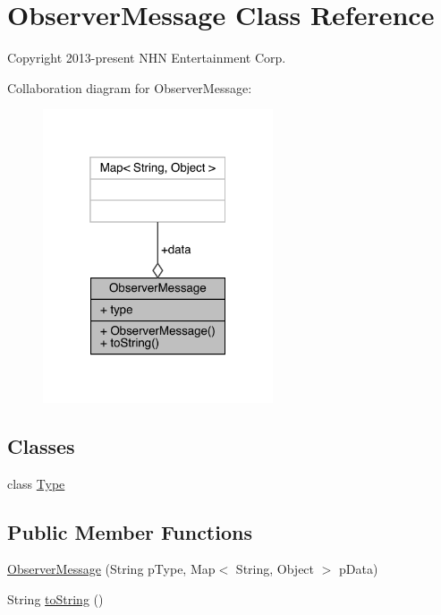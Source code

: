 \hypertarget{classcom_1_1toast_1_1android_1_1gamebase_1_1observer_1_1_observer_message}{}\section{Observer\+Message Class Reference}
\label{classcom_1_1toast_1_1android_1_1gamebase_1_1observer_1_1_observer_message}


Copyright 2013-\/present N\+HN Entertainment Corp.  




Collaboration diagram for Observer\+Message\+:\nopagebreak
\begin{figure}[H]
\begin{center}
\leavevmode
\includegraphics[width=193pt]{classcom_1_1toast_1_1android_1_1gamebase_1_1observer_1_1_observer_message__coll__graph}
\end{center}
\end{figure}
\subsection*{Classes}
\begin{DoxyCompactItemize}
\item 
class \hyperlink{classcom_1_1toast_1_1android_1_1gamebase_1_1observer_1_1_observer_message_1_1_type}{Type}
\end{DoxyCompactItemize}
\subsection*{Public Member Functions}
\begin{DoxyCompactItemize}
\item 
\hyperlink{classcom_1_1toast_1_1android_1_1gamebase_1_1observer_1_1_observer_message_a0d17c55fa642e66ccb819f5aa479bcf0}{Observer\+Message} (String p\+Type, Map$<$ String, Object $>$ p\+Data)
\item 
String \hyperlink{classcom_1_1toast_1_1android_1_1gamebase_1_1observer_1_1_observer_message_ad146fa8579a5f8a876c4688cc5a68520}{to\+String} ()
\end{DoxyCompactItemize}
